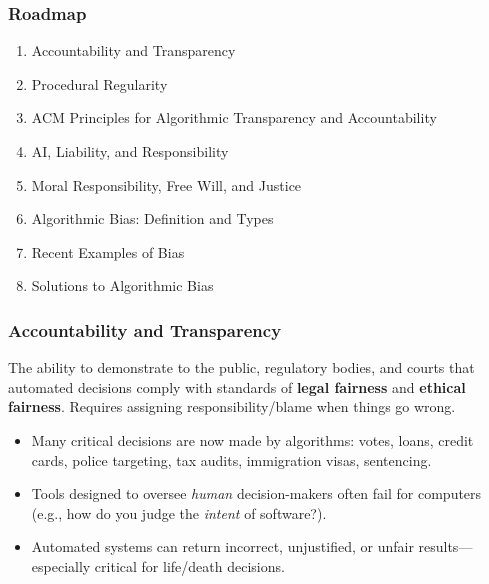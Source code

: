 \subsubsection*{Roadmap}
\begin{enumerate}
  \item Accountability and Transparency
  \item Procedural Regularity
  \item ACM Principles for Algorithmic Transparency and Accountability
  \item AI, Liability, and Responsibility
  \item Moral Responsibility, Free Will, and Justice
  \item Algorithmic Bias: Definition and Types
  \item Recent Examples of Bias
  \item Solutions to Algorithmic Bias
\end{enumerate}

\bigseparator

\subsubsection{Accountability and Transparency}

\begin{defbox}[Accountability]
The ability to demonstrate to the public, regulatory bodies, and courts that automated decisions comply with standards of \textbf{legal fairness} and \textbf{ethical fairness}. Requires assigning responsibility/blame when things go wrong.
\end{defbox}

\begin{keybox}
\begin{itemize}
  \item Many critical decisions are now made by algorithms: votes, loans, credit cards, police targeting, tax audits, immigration visas, sentencing.
  \item Tools designed to oversee \textit{human} decision-makers often fail for computers (e.g., how do you judge the \textit{intent} of software?).
  \item Automated systems can return incorrect, unjustified, or unfair results---especially critical for life/death decisions.
\end{itemize}
\end{keybox}

